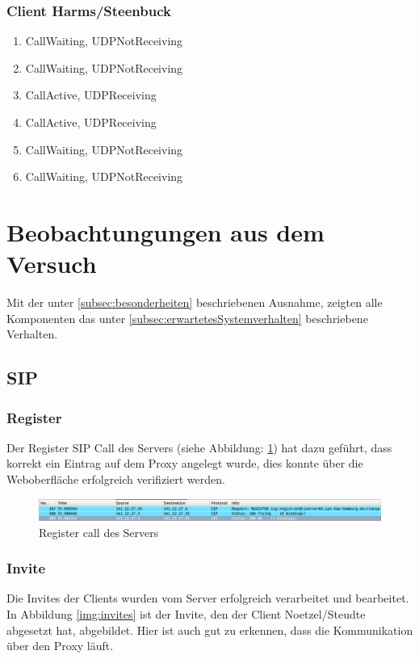 \documentclass[10pt]{scrartcl}
\begin{document}
\subsubsection{Client Harms/Steenbuck}
\begin{enumerate}
	\item CallWaiting, UDPNotReceiving
	\item CallWaiting, UDPNotReceiving
	\item CallActive, UDPReceiving
	\item CallActive, UDPReceiving
	\item CallWaiting, UDPNotReceiving
	\item CallWaiting, UDPNotReceiving
\end{enumerate}

	
	
\section{Beobachtungungen aus dem Versuch} \label{sec:beobachtung}
Mit der unter \ref{subsec:besonderheiten} beschriebenen Ausnahme, zeigten alle Komponenten das unter \ref{subsec:erwartetesSystemverhalten} beschriebene Verhalten.

\subsection{SIP}
	\subsubsection{Register} 
	Der Register SIP Call des Servers (siehe Abbildung: \ref{img:registerServer}) hat dazu geführt, dass korrekt ein Eintrag auf dem Proxy angelegt wurde, dies konnte über die Weboberfläche erfolgreich verifiziert werden.
	
	\begin{figure}[htb]
        \centering
         \includegraphics[width=\textwidth]{img/register}
         \caption{Register call des Servers}
        \label{img:registerServer}
	\end{figure}	
	
	\subsubsection{Invite}
	Die Invites der Clients wurden vom Server erfolgreich verarbeitet und bearbeitet. In Abbildung \ref{img:invites} ist der Invite, den der Client Noetzel/Steudte abgesetzt hat, abgebildet. Hier ist auch gut zu erkennen, dass die Kommunikation über den Proxy läuft.
\end{document}
